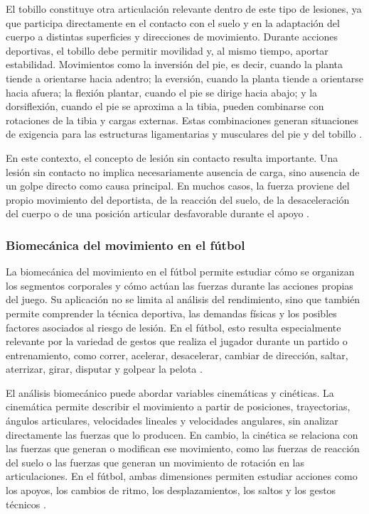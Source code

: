 El tobillo constituye otra articulación relevante dentro de este tipo de lesiones, ya que
participa directamente en el contacto con el suelo y en la adaptación del cuerpo a distintas
superficies y direcciones de movimiento. Durante acciones deportivas, el tobillo debe permitir
movilidad y, al mismo tiempo, aportar estabilidad. Movimientos como la inversión del pie, es
decir, cuando la planta tiende a orientarse hacia adentro; la eversión, cuando la planta tiende
a orientarse hacia afuera; la flexión plantar, cuando el pie se dirige hacia abajo; y la
dorsiflexión, cuando el pie se aproxima a la tibia, pueden combinarse con rotaciones de la tibia
y cargas externas. Estas combinaciones generan situaciones de exigencia para las estructuras
ligamentarias y musculares del pie y del tobillo \parencite{SanchezHernandezEtAl2016}.

En este contexto, el concepto de lesión sin contacto resulta importante. Una lesión sin contacto
no implica necesariamente ausencia de carga, sino ausencia de un golpe directo como causa
principal. En muchos casos, la fuerza proviene del propio movimiento del deportista, de la
reacción del suelo, de la desaceleración del cuerpo o de una posición articular desfavorable
durante el apoyo \parencite{ShimokochiShultz2008}.

\subsubsection{Biomecánica del movimiento en el fútbol}

La biomecánica del movimiento en el fútbol permite estudiar cómo se organizan los segmentos
corporales y cómo actúan las fuerzas durante las acciones propias del juego. Su aplicación no
se limita al análisis del rendimiento, sino que también permite comprender la técnica deportiva,
las demandas físicas y los posibles factores asociados al riesgo de lesión. En el fútbol, esto
resulta especialmente relevante por la variedad de gestos que realiza el jugador durante un
partido o entrenamiento, como correr, acelerar, desacelerar, cambiar de dirección, saltar,
aterrizar, girar, disputar y golpear la pelota \parencite{PlakiasEtAl2024}.

El análisis biomecánico puede abordar variables cinemáticas y cinéticas. La cinemática permite
describir el movimiento a partir de posiciones, trayectorias, ángulos articulares, velocidades
lineales y velocidades angulares, sin analizar directamente las fuerzas que lo producen. En
cambio, la cinética se relaciona con las fuerzas que generan o modifican ese movimiento, como
las fuerzas de reacción del suelo o las fuerzas que generan un movimiento de rotación en las
articulaciones. En el fútbol, ambas dimensiones permiten estudiar acciones como los apoyos,
los cambios de ritmo, los desplazamientos, los saltos y los gestos técnicos
\parencite{CossioBolanosArruda2009}.

